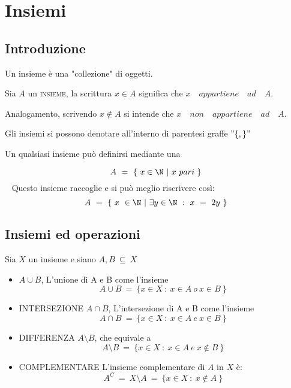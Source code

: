 \documentclass[../appunti.tex]{subfiles}
\begin{document}
\section{Insiemi}
\subsection{Introduzione}

\begin{defn}
	Un insieme è una "collezione" di oggetti.
\end{defn}

Sia $A$ un \textsc{insieme}, la scrittura $ x \in A $ significa che $x \quad
appartiene \quad ad \quad A$.

Analogamento, scrivendo $ x \notin A $ si intende che $ x \quad non \quad appartiene \quad ad \quad A$.

Gli insiemi  si possono denotare all'interno di parentesi graffe $ " \{ , \} " $

Un qualsiasi insieme può definirsi mediante una 

\begin{esem}
	\begin{equation}
	A\ =\ \{\ x \in \N\ |\ x\ pari\ \}
	\end{equation} 
	Questo insieme raccoglie  e si può meglio riscrivere così:
	\begin{equation}
	A\ =\ \{\ x\ \in \N\ |\ \exists y \in \N\ :\ x\ =\ 2y\ \}
	\end{equation}
\end{esem}

\subsection{Insiemi ed operazioni}
Sia $X$ un insieme e siano $A,B\ \subseteq\ X$
\begin{itemize}
	\item {} $A \cup B$, L'unione di A e B come l'insieme 
		\begin{equation}
			A \cup B\ =\ \{ x \in X\ :\ x\in A\ o\ x\in B\ \}
		\end{equation}
	\item \textsc{INTERSEZIONE} $A \cap B$, L'intersezione di A e B come l'insieme
		\begin{equation}
			A \cap B\ =\ \{ x \in X\ :\ x\in A\ e\ x\in B\ \}
		\end{equation}
	\item \textsc{DIFFERENZA} $A \setminus B$, che equivale a
		\begin{equation}
			A \setminus B\ =\ \{x \in X\ :\ x \in A\ e\ x \notin B\ \}
		\end{equation}
	\item \textsc{COMPLEMENTARE} L'insieme complementare di $A$ in $X$ è:
		\begin{equation}
			A^C\ =\ X \setminus A\ =\ \{x \in X\ :\ x \notin A\ \}
		\end{equation}
\end{itemize}
\end{document}
